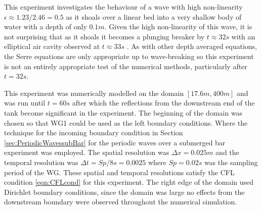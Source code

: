 This experiment investigates the behaviour of a wave with high non-linearity $ \epsilon \approx 1.23/2.46 = 0.5$ as it shoals over a linear bed into a very shallow body of water with a depth of only $0.1m$. Given the high non-linearity of this wave, it is not surprising that as it shoals it becomes a plunging breaker by $t \approx 32s$ with an elliptical air cavity observed at $t \approx 33s$ \cite{Roeber-2010}. As with other depth averaged equations, the Serre equations are only appropriate up to wave-breaking so this experiment is not an entirely appropriate test of the numerical methods, particularly after $t=32s$.

This experiment was numerically modelled on the domain $[17.6m , 400m]$ and was run until $t = 60s$ after which the reflections from the downstream end of the tank become significant in the experiment. The beginning of the domain was chosen so that WG1 could be used as the left boundary conditions. Where the technique for the incoming boundary condition in Section \ref{sec:PeriodicWavessubBar} for the periodic waves over a submerged bar experiment was employed. The spatial resolution was $\Delta x = 0.025m$ and the temporal resolution was $\Delta t = Sp / 8 s = 0.0025$ where $Sp = 0.02s$ was the sampling period of the WG. These spatial and temporal resolutions satisfy the CFL condition \eqref{eqn:CFLcond} for this experiment. The right edge of the domain used Dirichlet boundary conditions, since the domain was large no effects from the downstream boundary were observed throughout the numerical simulation. 

